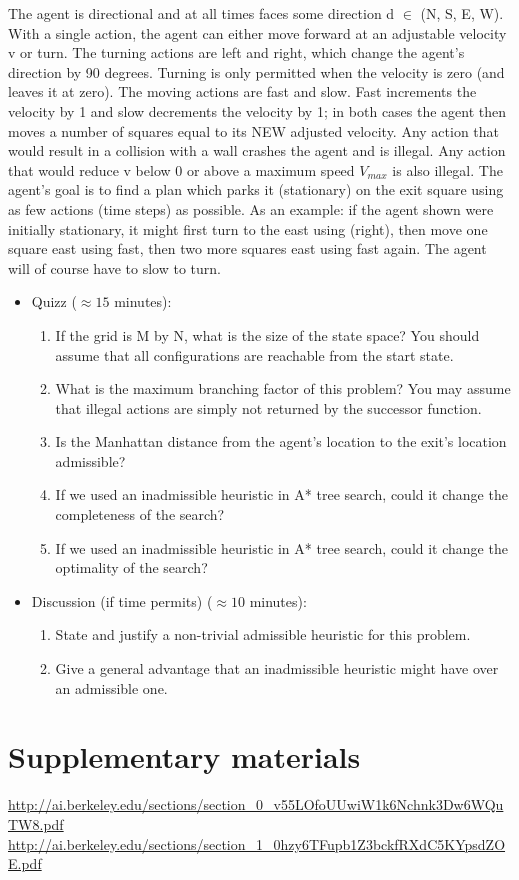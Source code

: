 \documentclass[9pt,a4paper]{extarticle}
\begin{document}
The agent is directional and at all times faces some direction d $\in$ (N, S, E, W). With a single action, the agent
can either move forward at an adjustable velocity v or turn. The turning actions are left and right, which change
the agent’s direction by 90 degrees. Turning is only permitted when the velocity is zero (and leaves it at zero).
The moving actions are fast and slow. Fast increments the velocity by 1 and slow decrements the velocity by 1;
in both cases the agent then moves a number of squares equal to its NEW adjusted velocity. Any action that
would result in a collision with a wall crashes the agent and is illegal. Any action that would reduce v below 0
or above a maximum speed $V_{max}$ is also illegal. The agent’s goal is to find a plan which parks it (stationary)
on the exit square using as few actions (time steps) as possible.
As an example: if the agent shown were initially stationary, it might first turn to the east using (right), then
move one square east using fast, then two more squares east using fast again. The agent will of course have to
slow to turn.

\begin{itemize}
    \item Quizz ($\approx 15$ minutes):
    \begin{enumerate}
    \item If the grid is M by N, what is the size of the state space? You should assume that all configurations are reachable from the start state.
    \item What is the maximum branching factor of this problem? You may assume that illegal actions are simply not returned by the successor function.
    \item Is the Manhattan distance from the agent’s location to the exit’s location admissible?
    \item If we used an inadmissible heuristic in A* tree search, could it change the completeness of the search?
    \item If we used an inadmissible heuristic in A* tree search, could it change the optimality of the search?
    \end{enumerate}
    \item Discussion (if time permits) ($\approx 10$ minutes):
    \begin{enumerate}
        \item State and justify a non-trivial admissible heuristic for this problem.
        \item Give a general advantage that an inadmissible heuristic might have over an admissible one.
    \end{enumerate}
\end{itemize}


\section{Supplementary materials}
   \url{http://ai.berkeley.edu/sections/section_0_v55LOfoUUwiW1k6Nchnk3Dw6WQuTW8.pdf}\\
   \url{http://ai.berkeley.edu/sections/section_1_0hzy6TFupb1Z3bckfRXdC5KYpsdZOE.pdf}\\
\end{document}
